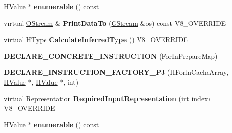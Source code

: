 \begin{DoxyCompactItemize}
\item 
\hypertarget{classv8_1_1internal_1_1_v8___f_i_n_a_l_ae6eda804bee613e7d904baf3c609f6f1}{}\hyperlink{classv8_1_1internal_1_1_h_value}{H\+Value} $\ast$ {\bfseries enumerable} () const \label{classv8_1_1internal_1_1_v8___f_i_n_a_l_ae6eda804bee613e7d904baf3c609f6f1}

\item 
\hypertarget{classv8_1_1internal_1_1_v8___f_i_n_a_l_ac450dad970b14246be761ccf5004924b}{}virtual \hyperlink{classv8_1_1internal_1_1_o_stream}{O\+Stream} \& {\bfseries Print\+Data\+To} (\hyperlink{classv8_1_1internal_1_1_o_stream}{O\+Stream} \&os) const V8\+\_\+\+O\+V\+E\+R\+R\+I\+D\+E\label{classv8_1_1internal_1_1_v8___f_i_n_a_l_ac450dad970b14246be761ccf5004924b}

\item 
\hypertarget{classv8_1_1internal_1_1_v8___f_i_n_a_l_a7a6782b8660ab150601db2ff28262edd}{}virtual H\+Type {\bfseries Calculate\+Inferred\+Type} () V8\+\_\+\+O\+V\+E\+R\+R\+I\+D\+E\label{classv8_1_1internal_1_1_v8___f_i_n_a_l_a7a6782b8660ab150601db2ff28262edd}

\item 
\hypertarget{classv8_1_1internal_1_1_v8___f_i_n_a_l_ace92ddca5b332c108f8cd115f54d8fcf}{}{\bfseries D\+E\+C\+L\+A\+R\+E\+\_\+\+C\+O\+N\+C\+R\+E\+T\+E\+\_\+\+I\+N\+S\+T\+R\+U\+C\+T\+I\+O\+N} (For\+In\+Prepare\+Map)\label{classv8_1_1internal_1_1_v8___f_i_n_a_l_ace92ddca5b332c108f8cd115f54d8fcf}

\item 
\hypertarget{classv8_1_1internal_1_1_v8___f_i_n_a_l_a47628dcacbb2bcd05fddea3e5e66bd01}{}{\bfseries D\+E\+C\+L\+A\+R\+E\+\_\+\+I\+N\+S\+T\+R\+U\+C\+T\+I\+O\+N\+\_\+\+F\+A\+C\+T\+O\+R\+Y\+\_\+\+P3} (H\+For\+In\+Cache\+Array, \hyperlink{classv8_1_1internal_1_1_h_value}{H\+Value} $\ast$, \hyperlink{classv8_1_1internal_1_1_h_value}{H\+Value} $\ast$, int)\label{classv8_1_1internal_1_1_v8___f_i_n_a_l_a47628dcacbb2bcd05fddea3e5e66bd01}

\item 
\hypertarget{classv8_1_1internal_1_1_v8___f_i_n_a_l_a6c6d1f37f40b113d8f4062f1ffff7215}{}virtual \hyperlink{classv8_1_1internal_1_1_representation}{Representation} {\bfseries Required\+Input\+Representation} (int index) V8\+\_\+\+O\+V\+E\+R\+R\+I\+D\+E\label{classv8_1_1internal_1_1_v8___f_i_n_a_l_a6c6d1f37f40b113d8f4062f1ffff7215}

\item 
\hypertarget{classv8_1_1internal_1_1_v8___f_i_n_a_l_ae6eda804bee613e7d904baf3c609f6f1}{}\hyperlink{classv8_1_1internal_1_1_h_value}{H\+Value} $\ast$ {\bfseries enumerable} () const \label{classv8_1_1internal_1_1_v8___f_i_n_a_l_ae6eda804bee613e7d904baf3c609f6f1}


\end{DoxyCompactItemize}
